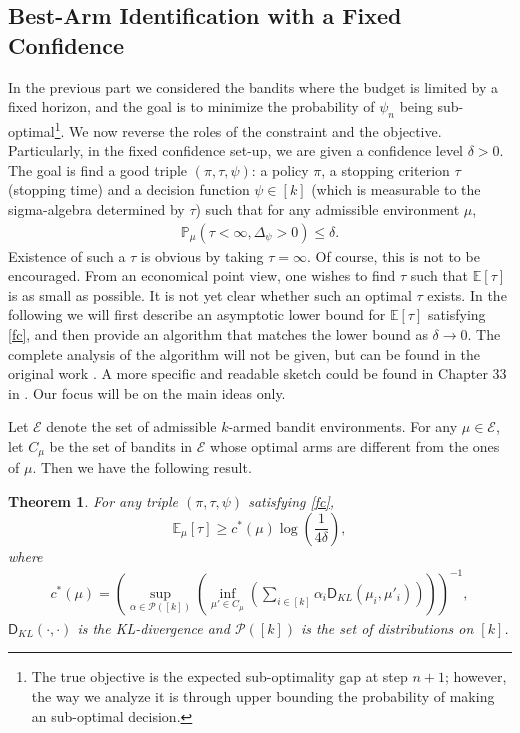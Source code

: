\documentclass[letterpaper,11pt,openright,openany]{book}
\numberwithin{equation}{section}
\theoremstyle{plain}
\newtheorem{Th}{Theorem}[section]
\theoremstyle{definition}
\def\E{{\mathbb E}}
\def\P{{\mathbb P}}
\begin{document}
\subsection{Best-Arm Identification with a Fixed Confidence}

In the previous part we considered the bandits where the budget is limited by a fixed horizon, and the goal is to minimize the probability of $\psi_n$ being sub-optimal\footnote{The true objective is the expected sub-optimality gap at step $n+1$; however, the way we analyze it is through upper bounding the probability of making an sub-optimal decision.}. We now reverse the roles of the constraint and the objective. Particularly, in the fixed confidence set-up, we are given a confidence level $\delta>0$. The goal is find a good triple $(\pi, \tau, \psi)$: a policy $\pi$, a stopping criterion $\tau$ (stopping time) and a decision function $\psi\in [k]$ (which is measurable to the sigma-algebra determined by $\tau$) such that for any admissible environment $\mu$, 
\begin{align}
\P_{\mu}\left(\tau<\infty, \Delta_\psi>0\right)\leq \delta. \label{fc}
\end{align}
Existence of such a $\tau$ is obvious by taking $\tau=\infty$. Of course, this is not to be encouraged. From an economical point view, one wishes to find $\tau$ such that $\E[\tau]$ is as small as possible. It is not yet clear whether such an optimal $\tau$ exists. In the following we will first describe an asymptotic lower bound for $\E[\tau]$ satisfying \eqref{fc}, and then provide an algorithm that matches the lower bound as $\delta\to 0$. The complete analysis of the algorithm will not be given, but can be found in the original work \cite{garivier2016optimal}. A more specific and readable sketch could be found in Chapter 33 in \cite{lattimore2018bandit}. Our focus will be on the main ideas only. 

Let $\mathcal E$ denote the set of admissible $k$-armed bandit environments. For any $\mu\in\mathcal E$, let $C_\mu$ be the set of bandits in $\mathcal E$ whose optimal arms are different from the ones of $\mu$. Then we have the following result. 

\begin{Th}\label{ba:lb}
For any triple $(\pi, \tau, \psi)$ satisfying \eqref{fc}, $$\E_\mu[\tau]\geq c^*(\mu)\log\left(\frac{1}{4\delta}\right),$$ where
\begin{align*}
c^*(\mu)=\left(\sup_{\alpha\in\mathcal P([k])}\left(\inf_{\mu'\in C_\mu}\left(\sum_{i\in [k]}\alpha_i\mathsf D_{KL}(\mu_i, \mu'_i)\right)\right)\right)^{-1},
\end{align*}
$\mathsf D_{KL}(\cdot, \cdot)$ is the KL-divergence and $\mathcal P([k])$ is the set of distributions on $[k]$. 
\end{Th}
\end{document}
